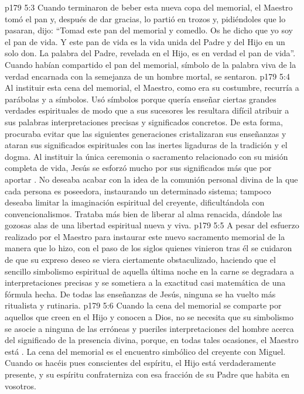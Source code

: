 \vs p179 5:3 Cuando terminaron de beber esta nueva copa del memorial, el Maestro tomó el pan y, después de dar gracias, lo partió en trozos y, pidiéndoles que lo pasaran, dijo: “Tomad este pan del memorial y comedlo. Os he dicho que yo soy el pan de vida. Y este pan de vida es la vida unida del Padre y del Hijo en un solo don. La palabra del Padre, revelada en el Hijo, es en verdad el pan de vida”. Cuando habían compartido el pan del memorial, símbolo de la palabra viva de la verdad encarnada con la semejanza de un hombre mortal, se sentaron.
\vs p179 5:4 \pc Al instituir esta cena del memorial, el Maestro, como era su costumbre, recurría a parábolas y a símbolos. Usó símbolos porque quería enseñar ciertas grandes verdades espirituales de modo que a sus sucesores les resultara difícil atribuir a sus palabras interpretaciones precisas y significados concretos. De esta forma, procuraba evitar que las siguientes generaciones cristalizaran sus enseñanzas y ataran sus significados espirituales con las inertes ligaduras de la tradición y el dogma. Al instituir la única ceremonia o sacramento relacionado con su misión completa de vida, Jesús se esforzó mucho por  sus significados más que por aportar . No deseaba acabar con la idea de la comunión personal divina de la que cada persona es poseedora, instaurando un determinado sistema; tampoco deseaba limitar la imaginación espiritual del creyente, dificultándola con convencionalismos. Trataba más bien de liberar al alma renacida, dándole las gozosas alas de una libertad espiritual nueva y viva.
\vs p179 5:5 A pesar del esfuerzo realizado por el Maestro para instaurar este nuevo sacramento memorial de la manera que lo hizo, con el paso de los siglos quienes vinieron tras él se cuidaron de que su expreso deseo se viera ciertamente obstaculizado, haciendo que el sencillo simbolismo espiritual de aquella última noche en la carne se degradara a interpretaciones precisas y se sometiera a la exactitud casi matemática de una fórmula hecha. De todas las enseñanzas de Jesús, ninguna se ha vuelto más ritualista y rutinaria.
\vs p179 5:6 Cuando la cena del memorial se comparte por aquellos que creen en el Hijo y conocen a Dios, no se necesita que su simbolismo se asocie a ninguna de las erróneas y pueriles interpretaciones del hombre acerca del significado de la presencia divina, porque, en todas tales ocasiones, el Maestro está . La cena del memorial es el encuentro simbólico del creyente con Miguel. Cuando os hacéis pues conscientes del espíritu, el Hijo está verdaderamente presente, y su espíritu confraterniza con esa fracción de su Padre que habita en vosotros.
